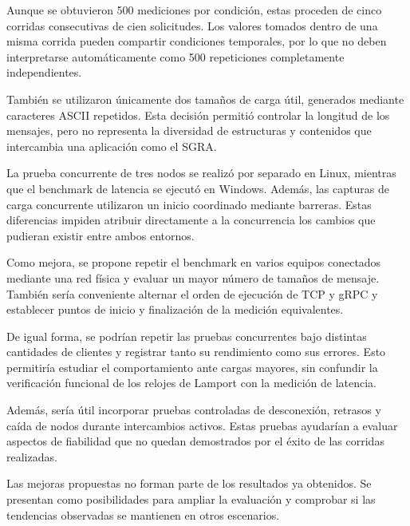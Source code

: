 Aunque se obtuvieron 500 mediciones por
condición, estas proceden de cinco corridas
consecutivas de cien solicitudes. Los valores
tomados dentro de una misma corrida pueden
compartir condiciones temporales, por lo que
no deben interpretarse automáticamente como
500 repeticiones completamente independientes.

También se utilizaron únicamente dos tamaños
de carga útil, generados mediante caracteres
ASCII repetidos. Esta decisión permitió
controlar la longitud de los mensajes, pero
no representa la diversidad de estructuras
y contenidos que intercambia una aplicación
como el SGRA.

La prueba concurrente de tres nodos se
realizó por separado en Linux, mientras
que el benchmark de latencia se ejecutó
en Windows. Además, las capturas de carga
concurrente utilizaron un inicio coordinado
mediante barreras. Estas diferencias impiden
atribuir directamente a la concurrencia
los cambios que pudieran existir entre
ambos entornos.

Como mejora, se propone repetir el benchmark
en varios equipos conectados mediante una
red física y evaluar un mayor número de
tamaños de mensaje. También sería conveniente
alternar el orden de ejecución de TCP y gRPC
y establecer puntos de inicio y finalización
de la medición equivalentes.

De igual forma, se podrían repetir las pruebas
concurrentes bajo distintas cantidades de
clientes y registrar tanto su rendimiento como
sus errores. Esto permitiría estudiar el
comportamiento ante cargas mayores, sin
confundir la verificación funcional de los
relojes de Lamport con la medición de latencia.

Además, sería útil incorporar pruebas
controladas de desconexión, retrasos y caída
de nodos durante intercambios activos.
Estas pruebas ayudarían a evaluar aspectos
de fiabilidad que no quedan demostrados por
el éxito de las corridas realizadas.

Las mejoras propuestas no forman parte de
los resultados ya obtenidos. Se presentan
como posibilidades para ampliar la evaluación
y comprobar si las tendencias observadas
se mantienen en otros escenarios.

